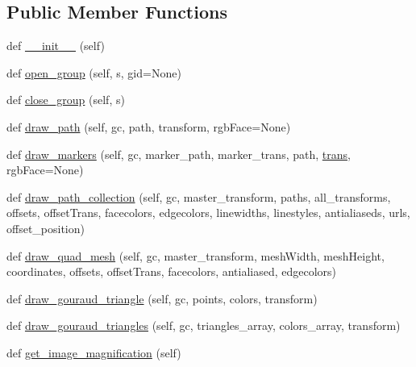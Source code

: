 \subsection*{Public Member Functions}
\begin{DoxyCompactItemize}
\item 
def \hyperlink{classmatplotlib_1_1backend__bases_1_1RendererBase_ae677a0bb8f81e30459f81b5ff62fd771}{\+\_\+\+\_\+init\+\_\+\+\_\+} (self)
\item 
def \hyperlink{classmatplotlib_1_1backend__bases_1_1RendererBase_a5a4ba575315b880703e939d32d9fa87a}{open\+\_\+group} (self, s, gid=None)
\item 
def \hyperlink{classmatplotlib_1_1backend__bases_1_1RendererBase_a18b934bbefd751765565059b82a04dd6}{close\+\_\+group} (self, s)
\item 
def \hyperlink{classmatplotlib_1_1backend__bases_1_1RendererBase_a7a569a35392227927ec8e773ac679044}{draw\+\_\+path} (self, gc, path, transform, rgb\+Face=None)
\item 
def \hyperlink{classmatplotlib_1_1backend__bases_1_1RendererBase_abe29ef2e63593cb93b677369bd939ca0}{draw\+\_\+markers} (self, gc, marker\+\_\+path, marker\+\_\+trans, path, \hyperlink{size_2foo_8f90_afabfd8da71309850231a00e53c61f106}{trans}, rgb\+Face=None)
\item 
def \hyperlink{classmatplotlib_1_1backend__bases_1_1RendererBase_a67af48871bd25863d3f4c6aa523f9fe7}{draw\+\_\+path\+\_\+collection} (self, gc, master\+\_\+transform, paths, all\+\_\+transforms, offsets, offset\+Trans, facecolors, edgecolors, linewidths, linestyles, antialiaseds, urls, offset\+\_\+position)
\item 
def \hyperlink{classmatplotlib_1_1backend__bases_1_1RendererBase_af2f9c679814f3bdd072844d412142345}{draw\+\_\+quad\+\_\+mesh} (self, gc, master\+\_\+transform, mesh\+Width, mesh\+Height, coordinates, offsets, offset\+Trans, facecolors, antialiased, edgecolors)
\item 
def \hyperlink{classmatplotlib_1_1backend__bases_1_1RendererBase_ad5ddf6488d4af7bfa3d1d7912174eff3}{draw\+\_\+gouraud\+\_\+triangle} (self, gc, points, colors, transform)
\item 
def \hyperlink{classmatplotlib_1_1backend__bases_1_1RendererBase_a6f6755c005aac6ab25ea5d7ad281ae27}{draw\+\_\+gouraud\+\_\+triangles} (self, gc, triangles\+\_\+array, colors\+\_\+array, transform)
\item 
def \hyperlink{classmatplotlib_1_1backend__bases_1_1RendererBase_aeac7921c4bfde9cbe67d892c0e7523d5}{get\+\_\+image\+\_\+magnification} (self)

\end{DoxyCompactItemize}
